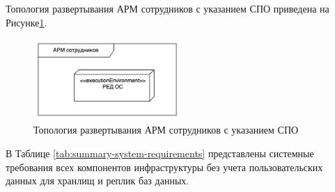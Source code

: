\documentclass[14pt, a4paper]{extarticle}
\begin{document}
Топология развертывания АРМ сотрудников с указанием СПО приведена на Рисунке\;\ref{fig:deployment_arm}.

\begin{figure}[H]
  \centering
  \includegraphics[width=0.5\textwidth]{deployment_arm.png}
  \caption{Топология развертывания АРМ сотрудников с указанием СПО}
  \label{fig:deployment_arm}
\end{figure}


В Таблице \;\ref{tab:summary-system-requirements} представлены системные требования всех компонентов
инфраструктуры без учета пользовательских данных для хранлищ и реплик баз данных.
\end{document}
